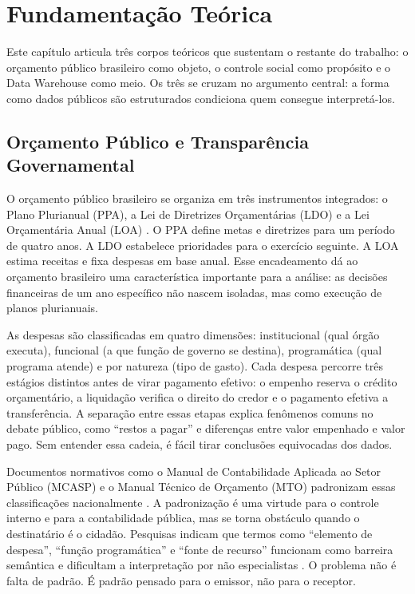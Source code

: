 \chapter{Fundamentação Teórica}
\label{cap:fundamentacao}

Este capítulo articula três corpos teóricos que sustentam o restante do trabalho: o orçamento público brasileiro como objeto, o controle social como propósito e o Data Warehouse como meio. Os três se cruzam no argumento central: a forma como dados públicos são estruturados condiciona quem consegue interpretá-los.

\section{Orçamento Público e Transparência Governamental}

O orçamento público brasileiro se organiza em três instrumentos integrados: o Plano Plurianual (PPA), a Lei de Diretrizes Orçamentárias (LDO) e a Lei Orçamentária Anual (LOA) \cite{giacomoni2021orcamento}. O PPA define metas e diretrizes para um período de quatro anos. A LDO estabelece prioridades para o exercício seguinte. A LOA estima receitas e fixa despesas em base anual. Esse encadeamento dá ao orçamento brasileiro uma característica importante para a análise: as decisões financeiras de um ano específico não nascem isoladas, mas como execução de planos plurianuais.

As despesas são classificadas em quatro dimensões: institucional (qual órgão executa), funcional (a que função de governo se destina), programática (qual programa atende) e por natureza (tipo de gasto). Cada despesa percorre três estágios distintos antes de virar pagamento efetivo: o empenho reserva o crédito orçamentário, a liquidação verifica o direito do credor e o pagamento efetiva a transferência. A separação entre essas etapas explica fenômenos comuns no debate público, como ``restos a pagar'' e diferenças entre valor empenhado e valor pago. Sem entender essa cadeia, é fácil tirar conclusões equivocadas dos dados.

Documentos normativos como o Manual de Contabilidade Aplicada ao Setor Público (MCASP) e o Manual Técnico de Orçamento (MTO) padronizam essas classificações nacionalmente \cite{MCASP,MTO}. A padronização é uma virtude para o controle interno e para a contabilidade pública, mas se torna obstáculo quando o destinatário é o cidadão. Pesquisas indicam que termos como ``elemento de despesa'', ``função programática'' e ``fonte de recurso'' funcionam como barreira semântica e dificultam a interpretação por não especialistas \cite{melo2019proposta,marco2022transparencia}. O problema não é falta de padrão. É padrão pensado para o emissor, não para o receptor.

